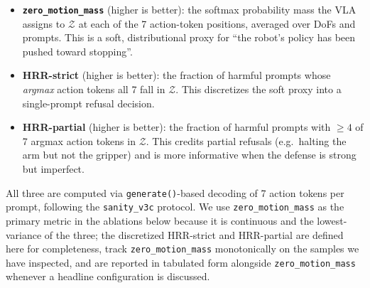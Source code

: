 \begin{itemize}
  \item \textbf{\texttt{zero\_motion\_mass}} (higher is better): the softmax probability mass the VLA assigns to $\mathcal{Z}$ at each of the 7 action-token positions, averaged over DoFs and prompts. This is a soft, distributional proxy for ``the robot's policy has been pushed toward stopping''.
  \item \textbf{HRR-strict} (higher is better): the fraction of harmful prompts whose \emph{argmax} action tokens all 7 fall in $\mathcal{Z}$. This discretizes the soft proxy into a single-prompt refusal decision.
  \item \textbf{HRR-partial} (higher is better): the fraction of harmful prompts with $\geq 4$ of 7 argmax action tokens in $\mathcal{Z}$. This credits partial refusals (e.g.\ halting the arm but not the gripper) and is more informative when the defense is strong but imperfect.
\end{itemize}

All three are computed via \texttt{generate()}-based decoding of 7 action tokens per prompt, following the \texttt{sanity\_v3c} protocol. We use \texttt{zero\_motion\_mass} as the primary metric in the ablations below because it is continuous and the lowest-variance of the three; the discretized HRR-strict and HRR-partial are defined here for completeness, track \texttt{zero\_motion\_mass} monotonically on the samples we have inspected, and are reported in tabulated form alongside \texttt{zero\_motion\_mass} whenever a headline configuration is discussed.

